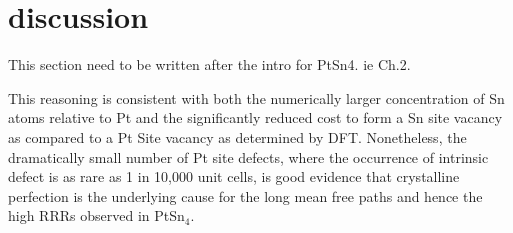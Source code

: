\section{discussion}
\par This section need to be written after the intro for PtSn4. ie Ch.2. 

\par This reasoning is consistent with both the numerically larger concentration of Sn atoms relative to Pt and the significantly reduced cost to form a Sn site vacancy as compared to a Pt Site vacancy as determined by DFT. Nonetheless, the dramatically small number of Pt site defects, where the occurrence of intrinsic defect is as rare as 1 in 10,000 unit cells, is good evidence that crystalline perfection is the underlying cause for the long mean free paths and hence the high RRRs observed in PtSn$_4$. 